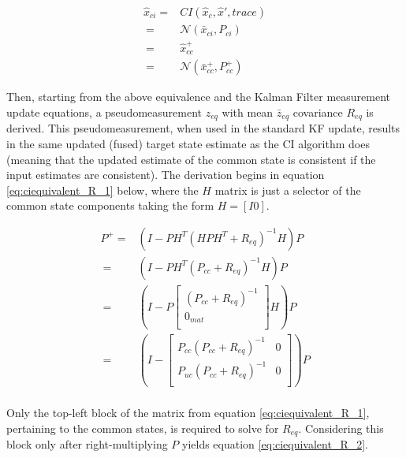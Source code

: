 \documentclass[journal]{IEEEtran}
\begin{document}
\begin{equation}
\begin{aligned}
    \hat{x}_{ci} ={}& CI(\hat{x}_{c}, \hat{x}', trace)\\
    \ ={}& \mathcal{N}(\bar{x}_{ci}, P_{ci})\\
    \ ={}& \hat{x}_{cc}^{+}\\
    \ ={}& \mathcal{N}(\bar{x}_{cc}^{+}, P_{cc}^{+})
\end{aligned} \label{eq:ciequivalent_est}
\end{equation}

Then, starting from the above equivalence and the Kalman Filter measurement update equations, a pseudomeasurement $z_{eq}$ with mean $\bar{z}_{eq}$ covariance $R_{eq}$ is derived. This pseudomeasurement, when used in the standard KF update, results in the same updated (fused) target state estimate as the CI algorithm does (meaning that the updated estimate of the common state is consistent if the input estimates are consistent). The derivation begins in equation \ref{eq:ciequivalent_R_1} below, where the $H$ matrix is just a selector of the common state components taking the form $H = [I 0]$.

\begin{equation}
\begin{aligned}
    P^{+} ={}& (I - P H^{T} (H P H^{T} + R_{eq})^{-1} H) P \\
    \ ={}&  (I - P H^{T} (P_{cc} + R_{eq})^{-1} H) P \\
    \ ={}&  (I - P \begin{bmatrix}
                        (P_{cc} + R_{eq})^{-1} \\
                        0_{mat} \\
                    \end{bmatrix} H) P \\
    \ ={}&  (I - \begin{bmatrix}
            P_{cc}(P_{cc} + R_{eq})^{-1} & 0 \\
            P_{uc}(P_{cc} + R_{eq})^{-1} & 0 \\
        \end{bmatrix}) P \\
\end{aligned} \label{eq:ciequivalent_R_1}
\end{equation}

Only the top-left block of the matrix from equation \ref{eq:ciequivalent_R_1}, pertaining to the common states, is required to solve for $R_{eq}$. Considering this block only after right-multiplying $P$ yields equation \ref{eq:ciequivalent_R_2}.
\end{document}
